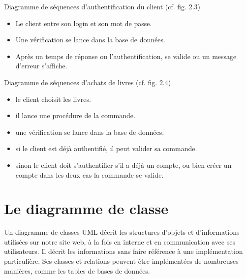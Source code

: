 Diagramme de séquences d’authentification du client (cf. fig. 2.3)
\begin{itemize}
\item Le client entre son login et son mot de passe.
\item Une vérification se lance dans la base de données.
\item Après un temps de réponse ou l’authentification, se valide ou un message d’erreur s’affiche.
\end{itemize}
\bigbreak
Diagramme de séquences d’achats de livres (cf. fig. 2.4)
\begin{itemize}
\item le client choisit les livres.
\item il lance une procédure de la commande.
\item une vérification se lance dans la base de données.
\item si le client est déjà authentifié, il peut valider sa commande.
\item sinon le client doit s’authentifier s'il a déjà un compte, ou bien créer un compte dans les deux cas la commande se valide.
\end{itemize}

\section{Le diagramme de classe}
Un diagramme de classes UML décrit les structures d'objets et d'informations utilisées sur notre site web, à la fois en interne et en communication avec ses utilisateurs. Il décrit les informations sans faire référence à une implémentation particulière. Ses classes et relations peuvent être implémentées de nombreuses manières, comme les tables de bases de données.

